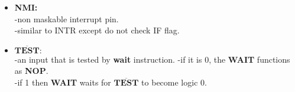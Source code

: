\documentclass[12pt]{article}
\begin{document}
\begin{itemize}
\begin{itemize}
		\item\textbf{NMI:}\\
		-non maskable interrupt pin.\\
		-similar to INTR except do not check IF flag.\\
		
		\item$\overline{\textbf{TEST}}:$\\
		-an input that is tested by \textbf{wait} instruction.
		-if it is 0, the \textbf{WAIT} functions as \textbf{NOP}.\\
		-if 1 then \textbf{WAIT} waits for   $\overline{\textbf{TEST}}$ to become logic 0.\\
	\end{itemize}
\end{itemize}

\newpage
\end{document}
